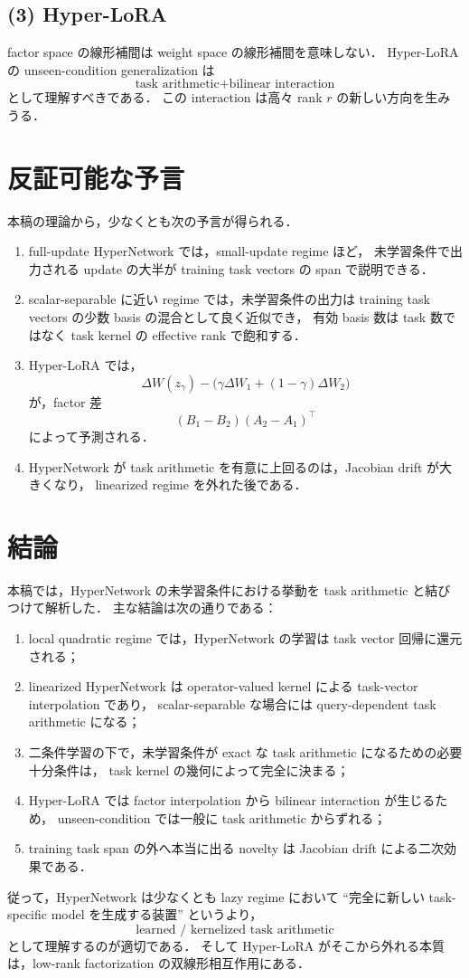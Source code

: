 \documentclass[a4paper,11pt]{bxjsarticle}
\theoremstyle{definition}
\begin{document}
\subsection*{(3) Hyper-LoRA}
factor space の線形補間は weight space の線形補間を意味しない．
Hyper-LoRA の unseen-condition generalization は
\[
\text{task arithmetic} + \text{bilinear interaction}
\]
として理解すべきである．
この interaction は高々 rank $r$ の新しい方向を生みうる．

\section{反証可能な予言}

本稿の理論から，少なくとも次の予言が得られる．

\begin{enumerate}[label=(P\arabic*)]
    \item full-update HyperNetwork では，small-update regime ほど，
    未学習条件で出力される update の大半が training task vectors の span で説明できる．
    \item scalar-separable に近い regime では，未学習条件の出力は training task vectors の少数 basis の混合として良く近似でき，
    有効 basis 数は task 数ではなく task kernel の effective rank で飽和する．
    \item Hyper-LoRA では，
    \[
    \Delta W(z_\gamma)-\bigl(\gamma\Delta W_1+(1-\gamma)\Delta W_2\bigr)
    \]
    が，factor 差
    \[
    (B_1-B_2)(A_2-A_1)^\top
    \]
    によって予測される．
    \item HyperNetwork が task arithmetic を有意に上回るのは，Jacobian drift が大きくなり，
    linearized regime を外れた後である．
\end{enumerate}

\section{結論}

本稿では，HyperNetwork の未学習条件における挙動を task arithmetic と結びつけて解析した．
主な結論は次の通りである：

\begin{enumerate}[label=(\alph*)]
    \item local quadratic regime では，HyperNetwork の学習は task vector 回帰に還元される；
    \item linearized HyperNetwork は operator-valued kernel による task-vector interpolation であり，
    scalar-separable な場合には query-dependent task arithmetic になる；
    \item 二条件学習の下で，未学習条件が exact な task arithmetic になるための必要十分条件は，
    task kernel の幾何によって完全に決まる；
    \item Hyper-LoRA では factor interpolation から bilinear interaction が生じるため，
    unseen-condition では一般に task arithmetic からずれる；
    \item training task span の外へ本当に出る novelty は Jacobian drift による二次効果である．
\end{enumerate}

従って，HyperNetwork は少なくとも lazy regime において
``完全に新しい task-specific model を生成する装置'' というより，
\[
\text{learned / kernelized task arithmetic}
\]
として理解するのが適切である．
そして Hyper-LoRA がそこから外れる本質は，low-rank factorization の双線形相互作用にある．
\end{document}
